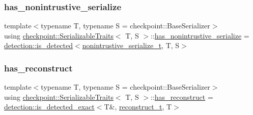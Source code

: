 \subsubsection{\texorpdfstring{has\+\_\+nonintrustive\+\_\+serialize}{has\_nonintrustive\_serialize}}
{\footnotesize\ttfamily template$<$typename T, typename S = checkpoint\+::\+Base\+Serializer$>$ \\
using \hyperlink{structcheckpoint_1_1_serializable_traits}{checkpoint\+::\+Serializable\+Traits}$<$ T, S $>$\+::\hyperlink{structcheckpoint_1_1_serializable_traits_abc3628bc485acd98b08840fb99450850}{has\+\_\+nonintrustive\+\_\+serialize} =  \hyperlink{namespacedetection_a30893549a3de1e9603d78dad6d5dce92}{detection\+::is\+\_\+detected}$<$\hyperlink{structcheckpoint_1_1_serializable_traits_a3284d2cfd29cfe429d5cf76186d3fe3c}{nonintrustive\+\_\+serialize\+\_\+t}, T, S$>$}

\mbox{\label{structcheckpoint_1_1_serializable_traits_a1c37f2f1a317fdd0d198c3d6ad2d35c4}} 
\subsubsection{\texorpdfstring{has\+\_\+reconstruct}{has\_reconstruct}}
{\footnotesize\ttfamily template$<$typename T, typename S = checkpoint\+::\+Base\+Serializer$>$ \\
using \hyperlink{structcheckpoint_1_1_serializable_traits}{checkpoint\+::\+Serializable\+Traits}$<$ T, S $>$\+::\hyperlink{structcheckpoint_1_1_serializable_traits_a1c37f2f1a317fdd0d198c3d6ad2d35c4}{has\+\_\+reconstruct} =  \hyperlink{namespacedetection_affc661f546e50448d9582e54280f7a11}{detection\+::is\+\_\+detected\+\_\+exact}$<$T\&, \hyperlink{structcheckpoint_1_1_serializable_traits_a9f161977ecf1aed8a4ccd5d63768399a}{reconstruct\+\_\+t}, T$>$}

\mbox{\label{structcheckpoint_1_1_serializable_traits_ab565b1e56509babb16ea5525ed4a3ebf}} 
